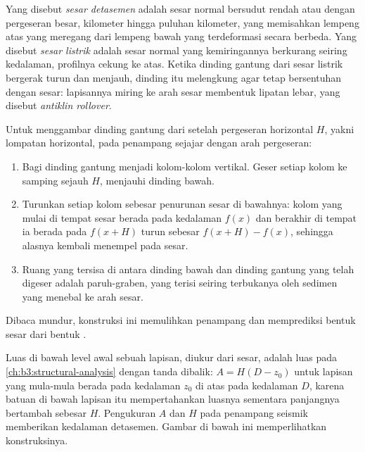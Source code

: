 \begin{definition}\label{def:b3:extension-strike-slip:detachment}
Yang disebut \emph{sesar detasemen} adalah sesar normal bersudut rendah
atau  dengan pergeseran besar, kilometer hingga puluhan kilometer, yang
memisahkan lempeng atas yang meregang dari lempeng bawah yang terdeformasi secara berbeda. Yang
disebut \emph{sesar listrik} adalah sesar normal yang kemiringannya
berkurang seiring kedalaman, profilnya cekung ke atas. Ketika dinding gantung dari
sesar listrik bergerak turun dan menjauh, dinding itu melengkung agar tetap bersentuhan dengan
sesar: lapisannya miring ke arah sesar membentuk lipatan lebar, yang disebut \emph{antiklin
rollover}.
\end{definition}

\begin{method}\label{met:b3:extension-strike-slip:heave}
Untuk menggambar dinding gantung dari  setelah pergeseran horizontal
$H$, yakni lompatan horizontal, pada penampang sejajar dengan arah pergeseran:
\begin{enumerate}
  \item Bagi dinding gantung menjadi kolom-kolom vertikal. Geser setiap kolom
        ke samping sejauh $H$, menjauhi dinding bawah.
  \item Turunkan setiap kolom sebesar penurunan sesar di bawahnya: kolom yang
        mulai di tempat sesar berada pada kedalaman $f(x)$ dan berakhir di tempat ia berada
        pada $f(x + H)$ turun sebesar $f(x + H) - f(x)$, sehingga alasnya
        kembali menempel pada sesar.
  \item Ruang yang tersisa di antara dinding bawah dan dinding gantung yang telah digeser adalah
        paruh-graben, yang terisi seiring terbukanya oleh sedimen yang menebal ke arah
        sesar.
\end{enumerate}
Dibaca mundur, konstruksi ini memulihkan penampang dan memprediksi bentuk
sesar dari bentuk .
\end{method}

Luas di bawah level awal sebuah lapisan, diukur dari sesar, adalah
luas pada \cref{ch:b3:structural-analysis} dengan tanda dibalik: $A =
H(D - z_0)$ untuk lapisan yang mula-mula berada pada kedalaman $z_0$ di atas  pada
kedalaman $D$, karena batuan di bawah lapisan itu mempertahankan luasnya sementara panjangnya bertambah
sebesar $H$. Pengukuran $A$ dan $H$ pada penampang seismik memberikan kedalaman
detasemen. Gambar di bawah ini memperlihatkan konstruksinya.

